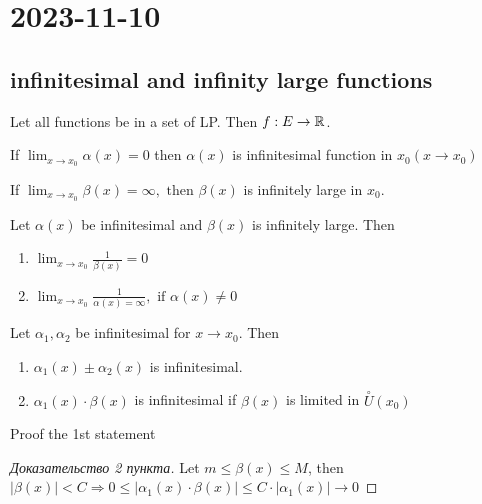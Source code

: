 \section{2023-11-10}

\subsection{infinitesimal and infinity large functions}

Let all functions be in a set of LP. Then $f: E \to \mathbb{R}$.

\begin{definition}[]
    If $\lim_{x \to x_0} \alpha(x) = 0$ then $\alpha(x)$ is infinitesimal function in $x_0 (x \to x_{0})$ 

    If $\lim_{x \to x_0} \beta(x) = \infty, \text{ then } \beta(x)$ is infinitely large in $x_0$.
\end{definition}

\begin{lemma}
    Let $\alpha(x)$ be infinitesimal and $\beta(x)$ is infinitely large. Then \begin{enumerate}
        \item $\lim_{x \to x_0} \frac{1}{\beta(x)} = 0$ 
        \item $\lim_{x \to x_0} \frac{1}{\alpha(x) = \infty}, \text{ if $\alpha(x) \neq 0$ } $ 
    \end{enumerate}
\end{lemma}

\begin{lemma}
    Let $\alpha_1, \alpha_2$ be infinitesimal for $x \to x_0$. Then \begin{enumerate}
        \item $\alpha_1(x) \pm \alpha_2(x)$ is infinitesimal.
        \item $\alpha_1(x) \cdot \beta(x)$ is infinitesimal if $\beta(x)$ is limited in $\overset{\circ} U(x_0)$
    \end{enumerate}
\end{lemma}

\begin{exercise}
    Proof the 1st statement
\end{exercise}

\begin{proof}[Доказательство 2 пункта]
    Let $m \leq \beta(x) \leq M$, then $\left| \beta(x) \right| < C \Rightarrow 0 \leq \left| \alpha_1(x) \cdot \beta(x) \right| \leq C \cdot \left| \alpha_1(x) \right| \to 0  $
\end{proof}

